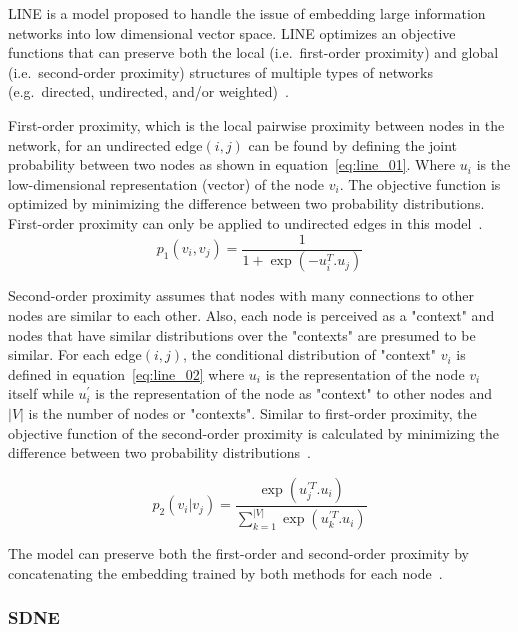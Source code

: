 \ac{LINE} is a model proposed to handle the issue of embedding large information networks into low dimensional vector space.
\ac{LINE} optimizes an objective functions that can preserve both the local (i.e.~first-order proximity) and global (i.e.~second-order proximity) structures of multiple types of networks (e.g.~directed, undirected, and/or weighted)~\cite{tang_line:_2015}.

First-order proximity, which is the local pairwise proximity between nodes in the network, for an undirected edge$(i,j)$ can be found by defining the joint probability between two nodes as shown in equation~\ref{eq:line_01}.
Where $u_{i}$ is the low-dimensional representation (vector) of the node $v_{i}$.
The objective function is optimized by minimizing the difference between two probability distributions.
First-order proximity can only be applied to undirected edges in this model~\cite{tang_line:_2015}.
\begin{equation}
    \label{eq:line_01}
    p_{1}(v_{i}, v_{j}) = \frac{1}{1+ \exp{(-u_{i}^T .u_{j})}}
\end{equation}

Second-order proximity assumes that nodes with many connections to other nodes are similar to each other.
Also, each node is perceived as a "context" and nodes that have similar distributions over the "contexts" are presumed to be similar.
For each edge$(i,j)$, the conditional distribution of "context" $v_{i}$ is defined in equation~\ref{eq:line_02} where $u_{i}$ is the representation of the node $v_{i}$ itself while $u_{i}^{'}$ is the representation of the node as "context" to other nodes and $|V|$ is the number of nodes or "contexts".
Similar to first-order proximity, the objective function of the second-order proximity is calculated by minimizing the difference between two probability distributions~\cite{tang_line:_2015}.

\begin{equation}
    \label{eq:line_02}
    p_{2}(v_{i}| v_{j}) = \frac{\exp(u_{j}^{'T} .u_{i})}{\sum_{k=1}^{|V|} \exp{(u_{k}^{'T} .u_{i})}}
\end{equation}

The model can preserve both the first-order and second-order proximity by concatenating the embedding trained by both methods for each node~\cite{tang_line:_2015}.

\subsubsection{SDNE}\label{subsection:SDNE}

